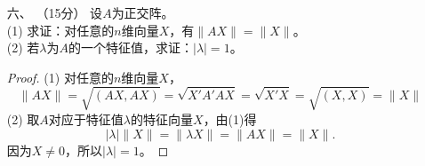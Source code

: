 \begin{enumerate}[1~]
\begin{proof}
因为
\[
A=2I+J,
\]
其中$J=\left( \begin{matrix}
	0&		1&		0\\
	0&		0&		1\\
	0&		0&		0\\
\end{matrix} \right) $。\\
所以
\begin{align*}
A^n&=(2I+J)^n=\sum_{r=0}^n{\binom{n}{r} \left( 2I \right) ^{n-r}J^r}=\binom{n}{0} \left( 2I \right) ^nJ^0+\binom{n}{1} \left( 2I \right) ^{n-1}J^1+\binom{n}{2} \left( 2I \right) ^{n-2}J^2\\
&=\left( \begin{matrix}
	2^n&		2^{n-1}n&		2^{n-3}n\left( n-1 \right)\\
	0&		2^n&		2^{n-1}n\\
	0&		0&		2^n\\
\end{matrix} \right) .
\end{align*}
\end{proof}

\item[六、]（15分）
设$A$为正交阵。\\
(1) 求证：对任意的$n$维向量$X$，有$\lVert AX \rVert =\lVert X \rVert $。\\
(2) 若$\lambda$为$A$的一个特征值，求证：$|\lambda|=1$。
\begin{proof}
(1) 对任意的$n$维向量$X$，\[
\lVert AX \rVert =\sqrt{(AX, AX)}=\sqrt{X'A'AX}=\sqrt{X'X}=\sqrt{(X, X)}=\lVert X \rVert 
\]
(2) 取$A$对应于特征值$\lambda$的特征向量$X$，由(1)得\[
|\lambda|\lVert X\rVert=\lVert\lambda X\rVert=\lVert AX \rVert=\lVert X \rVert.
\]
因为$X\ne 0$，所以$|\lambda|=1$。
\end{proof}


\end{enumerate}
